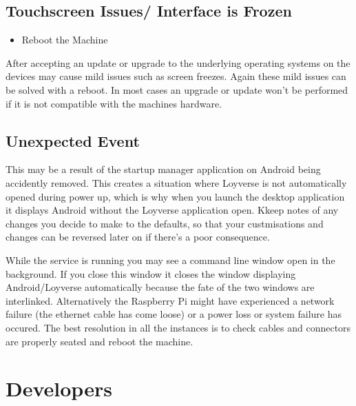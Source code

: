 \documentclass[letterpaper,10pt,openany,oneside,english]{sphinxmanual}
\begin{document}
\subsection{Touchscreen Issues/ Interface is Frozen}
\label{\detokenize{troubleshooting:touchscreen-issues-interface-is-frozen}}\begin{itemize}
\item {} 
Reboot the Machine

\end{itemize}

After accepting an update or upgrade to the underlying operating systems on the devices may cause mild issues such as screen freezes.
Again these mild issues can be solved with a reboot. In most cases an upgrade or update won’t be performed if it is not compatible with the machines hardware.


\subsection{Unexpected Event}
\label{\detokenize{troubleshooting:unexpected-event}}

This may be a result of the startup manager application on Android being accidently removed. This creates a situation where Loyverse is not automatically opened during power up, which is why when you launch the desktop application it displays Android without the Loyverse application open. Kkeep notes of any changes you decide to make to the defaults, so that your custmisations and changes can be reversed later on if there’s a poor consequence.


While the service is running you may see a command line window open in the background. If you close this window it closes the window displaying Android/Loyverse automatically because the fate of the two windows are interlinked. Alternatively the Raspberry Pi might have experienced a network failure (the ethernet cable has come loose) or a power loss or system failure has occured. The best resolution in all the instances is to check cables and connectors are properly seated and reboot the machine.


\section{Developers}
\label{\detokenize{developers:developers}}\label{\detokenize{developers::doc}}
\end{document}
